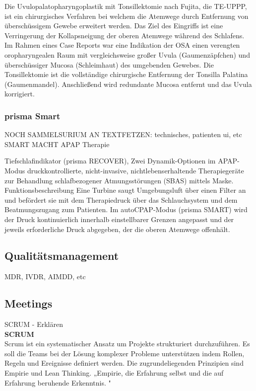 \documentclass[a4paper, 12pt]{article}
\begin{document}
\begin{itemize}
    Die Uvulopalatopharyngoplastik mit Tonsillektomie nach Fujita, die TE-UPPP, ist ein chirurgisches Verfahren bei welchem die Atemwege durch Entfernung von überschüssigem Gewebe erweitert werden. Das Ziel des Eingriffs ist eine Verringerung der Kollapsneigung der oberen Atemwege während des Schlafens. Im Rahmen eines Case Reports war eine Indikation der OSA einen verengten oropharyngealen Raum mit vergleichsweise großer Uvula (Gaumenzäpfchen) und überschüssiger Mucosa (Schleimhaut) des umgebenden Gewebes. Die Tonsillektomie ist die vollständige chirurgische Entfernung der Tonsilla Palatina (Gaumenmandel). Anschließend wird redundante Mucosa entfernt und das Uvula korrigiert. \cite{Fujita_UPPP}
\end{itemize}


\subsubsection{prisma Smart}
NOCH SAMMELSURIUM AN TEXTFETZEN:
technisches, patienten ui, etc
SMART MACHT APAP Therapie

Tiefschlafindikator (prisma RECOVER), Zwei Dynamik-Optionen im APAP-Modus
druckkontrollierte, nicht-invasive, nichtlebenserhaltende Therapiegeräte zur Behandlung schlafbezogener Atmungsstörungen (SBAS) mittels Maske.
 Funktionsbeschreibung
Eine Turbine saugt Umgebungsluft über einen Filter an und befördert sie mit dem
Therapiedruck über das Schlauchsystem und dem Beatmungszugang zum Patienten. 
Im autoCPAP-Modus (prisma SMART) wird der Druck kontinuierlich innerhalb
einstellbarer Grenzen angepasst und der jeweils erforderliche Druck abgegeben, der
die oberen Atemwege offenhält. 
\cite{manual_smart}

\subsection{Qualitätsmanagement}\label{Qualitätsmanagement}
MDR, IVDR, AIMDD, etc

\subsection{Meetings}\label{Meetings}
SCRUM - Erklären
\\ 
\textbf{SCRUM}\\
Scrum ist ein systematischer Ansatz um Projekte strukturiert durchzuführen. Es soll die Teams bei der Lösung komplexer Probleme unterstützen indem Rollen, Regeln und Ereignisse definiert werden. Die zugrundeliegenden Prinzipien sind Empirie und Lean Thinking. 
„Empirie, die Erfahrung selbst und die auf Erfahrung beruhende Erkenntnis.  
 \cite{dorsch_empirie}" 
\end{document}
